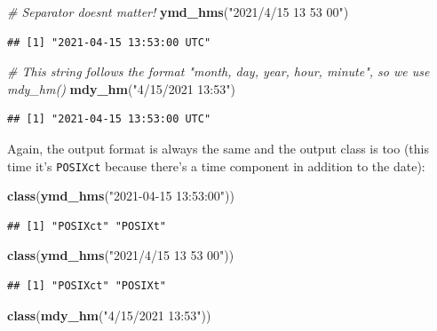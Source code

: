 \documentclass[
]{book}
\newenvironment{Shaded}{\begin{snugshade}}{\end{snugshade}}
\newcommand{\CommentTok}[1]{\textcolor[rgb]{0.56,0.35,0.01}{\textit{#1}}}
\newcommand{\FunctionTok}[1]{\textcolor[rgb]{0.13,0.29,0.53}{\textbf{#1}}}
\newcommand{\NormalTok}[1]{#1}
\newcommand{\StringTok}[1]{\textcolor[rgb]{0.31,0.60,0.02}{#1}}
\begin{document}
\begin{Shaded}
\begin{Highlighting}[]
\CommentTok{\# Separator doesn\textquotesingle{}t matter! }
\FunctionTok{ymd\_hms}\NormalTok{(}\StringTok{"2021/4/15 13 53 00"}\NormalTok{)}
\end{Highlighting}
\end{Shaded}

\begin{verbatim}
## [1] "2021-04-15 13:53:00 UTC"
\end{verbatim}

\begin{Shaded}
\begin{Highlighting}[]
\CommentTok{\# This string follows the format "month, day, year, hour, minute", so we use mdy\_hm()}
\FunctionTok{mdy\_hm}\NormalTok{(}\StringTok{"4/15/2021 13:53"}\NormalTok{)}
\end{Highlighting}
\end{Shaded}

\begin{verbatim}
## [1] "2021-04-15 13:53:00 UTC"
\end{verbatim}

Again, the output format is always the same and the output class is too (this time it's \texttt{POSIXct} because there's a time component in addition to the date):

\begin{Shaded}
\begin{Highlighting}[]
\FunctionTok{class}\NormalTok{(}\FunctionTok{ymd\_hms}\NormalTok{(}\StringTok{"2021{-}04{-}15 13:53:00"}\NormalTok{))}
\end{Highlighting}
\end{Shaded}

\begin{verbatim}
## [1] "POSIXct" "POSIXt"
\end{verbatim}

\begin{Shaded}
\begin{Highlighting}[]
\FunctionTok{class}\NormalTok{(}\FunctionTok{ymd\_hms}\NormalTok{(}\StringTok{"2021/4/15 13 53 00"}\NormalTok{))}
\end{Highlighting}
\end{Shaded}

\begin{verbatim}
## [1] "POSIXct" "POSIXt"
\end{verbatim}

\begin{Shaded}
\begin{Highlighting}[]
\FunctionTok{class}\NormalTok{(}\FunctionTok{mdy\_hm}\NormalTok{(}\StringTok{"4/15/2021 13:53"}\NormalTok{))}
\end{Highlighting}
\end{Shaded}
\end{document}
